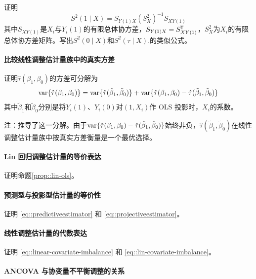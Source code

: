 证明
$$
S^2(1\mid X) = S_{Y(1)X} (S_X^2)^{-1} S_{XY(1)}
$$
其中$S_{XY(1)}$是$X_i$与$Y_i(1)$的有限总体协方差，$S_{Y(1)X} = S_{XY(1)}^{\mkern-1.5mu\mathsf{T}}$，$S_X^2$为$X_i$的有限总体协方差矩阵。写出$S^2(0\mid X) $和$S^2(\tau\mid X) .$的类似公式。



\paragraph{比较线性调整估计量族中的真实方差}\label{hw::compare-true-variance} 



证明$\hat{\tau}(\beta_1, \beta_0)$的方差可分解为
$$
\textup{var}\{ \hat{\tau}(\beta_1, \beta_0) \} 
=  
\textup{var}\{ \hat{\tau}( \tilde{\beta}_1, \tilde{\beta}_0) \}  
+
\textup{var}\{ \hat{\tau}(\beta_1, \beta_0) - \hat{\tau}(\tilde{\beta}_1, \tilde{\beta}_0) \}
$$
其中$\tilde{\beta}_1$和$\tilde{\beta}_0$分别是将$Y_i(1)$、$Y_i(0)$对$(1, X_i)$作 OLS 投影时，$X_i$的系数。 



注：\citet[][Example 9]{li2017general}推导了这一分解。由于$\textup{var}\{ \hat{\tau}(\beta_1, \beta_0) - \hat{\tau}(\tilde{\beta}_1, \tilde{\beta}_0) \}$始终非负，$\hat{\tau}( \tilde{\beta}_1, \tilde{\beta}_0)$在线性调整估计量族中按真实方差衡量是一个最优选择。   




\paragraph{Lin 回归调整估计量的等价表达}\label{para::lin-ols-covadj}

证明命题\ref{prop::lin-ols}。 

\paragraph{预测型与投影型估计量的等价性}\label{para::predictiveestimator}
证明 \eqref{eq::predictiveestimator} 和 \eqref{eq::projectiveestimator}。 
 
 
 \paragraph{线性调整估计量的代数表达}\label{para::reg-covariate-imbalance}

证明 \eqref{eq::linear-covariate-imbalance} 和 \eqref{eq::lin-covariate-imbalance}。 
 
 
 
\paragraph{ANCOVA 与协变量不平衡调整的关系}
\label{para::ancova-imbalance}

